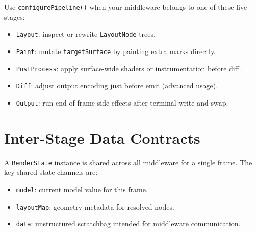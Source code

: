 Use \texttt{c\allowbreak{}o\allowbreak{}n\allowbreak{}f\allowbreak{}i\allowbreak{}g\allowbreak{}u\allowbreak{}r\allowbreak{}e\allowbreak{}P\allowbreak{}i\allowbreak{}p\allowbreak{}e\allowbreak{}l\allowbreak{}i\allowbreak{}n\allowbreak{}e\allowbreak{}(\allowbreak{})} when your middleware belongs to one of these five stages:

\begin{itemize}
\tightlist
\item
  \texttt{L\allowbreak{}a\allowbreak{}y\allowbreak{}o\allowbreak{}u\allowbreak{}t}: inspect or rewrite \texttt{L\allowbreak{}a\allowbreak{}y\allowbreak{}o\allowbreak{}u\allowbreak{}t\allowbreak{}N\allowbreak{}o\allowbreak{}d\allowbreak{}e} trees.
\item
  \texttt{P\allowbreak{}a\allowbreak{}i\allowbreak{}n\allowbreak{}t}: mutate \texttt{t\allowbreak{}a\allowbreak{}r\allowbreak{}g\allowbreak{}e\allowbreak{}t\allowbreak{}S\allowbreak{}u\allowbreak{}r\allowbreak{}f\allowbreak{}a\allowbreak{}c\allowbreak{}e} by painting extra marks directly.
\item
  \texttt{P\allowbreak{}o\allowbreak{}s\allowbreak{}t\allowbreak{}P\allowbreak{}r\allowbreak{}o\allowbreak{}c\allowbreak{}e\allowbreak{}s\allowbreak{}s}: apply surface-wide shaders or instrumentation before diff.
\item
  \texttt{D\allowbreak{}i\allowbreak{}f\allowbreak{}f}: adjust output encoding just before emit (advanced usage).
\item
  \texttt{O\allowbreak{}u\allowbreak{}t\allowbreak{}p\allowbreak{}u\allowbreak{}t}: run end-of-frame side-effects after terminal write and swap.
\end{itemize}

\section{Inter-Stage Data Contracts}\label{record-014-inter-stage-data-contracts}

A \texttt{R\allowbreak{}e\allowbreak{}n\allowbreak{}d\allowbreak{}e\allowbreak{}r\allowbreak{}S\allowbreak{}t\allowbreak{}a\allowbreak{}t\allowbreak{}e} instance is shared across all middleware for a single frame. The key shared state channels are:

\begin{itemize}
\tightlist
\item
  \texttt{m\allowbreak{}o\allowbreak{}d\allowbreak{}e\allowbreak{}l}: current model value for this frame.
\item
  \texttt{l\allowbreak{}a\allowbreak{}y\allowbreak{}o\allowbreak{}u\allowbreak{}t\allowbreak{}M\allowbreak{}a\allowbreak{}p}: geometry metadata for resolved nodes.
\item
  \texttt{d\allowbreak{}a\allowbreak{}t\allowbreak{}a}: unstructured scratchbag intended for middleware communication.
\end{itemize}

